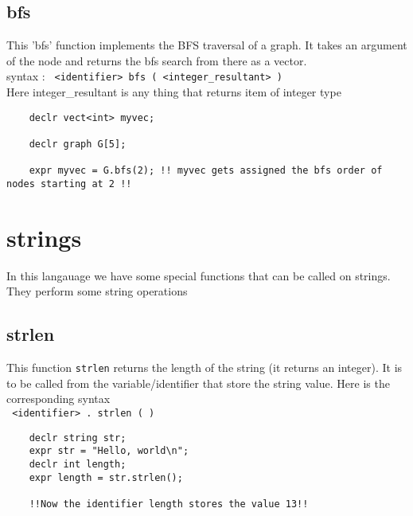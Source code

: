 \documentclass[journal, 18pt]{report}
\begin{document}
\subsection{bfs}
This 'bfs' function implements the BFS traversal of a graph. It takes an argument of the node and returns the bfs search from there as a vector.\\
syntax : \texttt{ <identifier> bfs ( <integer\_resultant> ) }\\
Here integer\_resultant is any thing that returns item of integer type
\begin{lstlisting}
    declr vect<int> myvec;
    
    declr graph G[5];
    
    expr myvec = G.bfs(2); !! myvec gets assigned the bfs order of nodes starting at 2 !!
\end{lstlisting}

\section{strings}
In this langauage we have some special functions that can be called on strings. They perform some string operations

\subsection{strlen}
This function \texttt{strlen} returns the length of the string (it returns an integer). It is to be called from the variable/identifier that store the string value. Here is the corresponding syntax\\
\texttt{ <identifier> . strlen ( )}
\begin{lstlisting}
    declr string str;
    expr str = "Hello, world\n";
    declr int length;
    expr length = str.strlen();

    !!Now the identifier length stores the value 13!!
\end{lstlisting}
\end{document}
